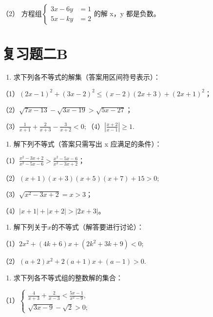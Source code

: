 （2）
方程组\(\left\{\begin{aligned}3x-6y&=1\\ 5x-ky&=2\end{aligned}\right.\)的解
x，y 都是负数。

\section{复习题二B}

\begin{enumerate}
\item
  求下列各不等式的解集（答案用区间符号表示）：
\end{enumerate}

（1）\((2x - 1)^{2} + (3x - 2)^{2} \leqslant (x - 2)(2x + 3) + (2x + 1)^{2}\)；

（2）\(\sqrt{7x - 13} - \sqrt{3x - 19} > \sqrt{5x - 27}\)；

（3）\(\frac{1}{x + 1} + \frac{2}{x + 3} - \frac{3}{x + 2} < 0;\)（4）\(\left|\frac{x + 2}{x - 1}\right| \geqslant 1.\)

\begin{enumerate}[start=2]
\item
  解下列不等式（答案只需写出 x 应满足的条件）：
\end{enumerate}

（1）\(\frac{x^2 - 3x + 2}{x^2 - 5x - 6} > \frac{x^2 - 5x - 6}{x^2 - 3x + 2}\)；

（2）\((x + 1)(x + 3)(x + 5)(x + 7) + 15 > 0;\)

（3）\(\sqrt{x^2 - 3x + 2} = x > 3\)；

（4）\(|x + 1| + |x + 2| > |2x + 3|\)。

\begin{enumerate}[start=3]
\item
  解下列关于\(x\)的不等式（解答要进行讨论）：
\end{enumerate}

（1）\(2x^{2} + (4k + 6)x + (2k^{2} + 3k + 9) < 0;\)

（2）\((a + 2)x^{2} + 2(a + 1)x + (a - 1) > 0.\)

\begin{enumerate}[start=4]
\item
  求下列各不等式组的整数解的集合：
\end{enumerate}

（1）\(\left\{ \begin{array}{l} \frac{4}{x + 3} + \frac{2}{x - 3} < \frac{5x - 1}{x^2 - 9}, \\ \sqrt{3x - 9} - \sqrt{2} > 0; \end{array} \right.\)

